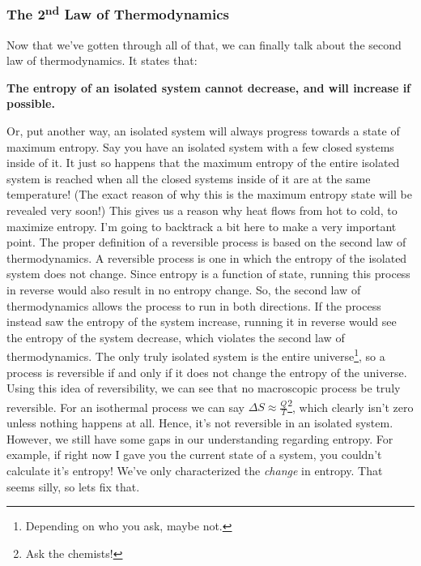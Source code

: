 \subsubsection{\texorpdfstring{The 2\textsuperscript{nd} Law of Thermodynamics}{The 2nd Law of Thermodynamics}}
Now that we've gotten through all of that, we can finally talk about the second law of thermodynamics. It states that:
\begin{center}
    \textbf{The entropy of an isolated system cannot decrease, and will increase if possible.}
\end{center}
Or, put another way, an isolated system will always progress towards a state of maximum entropy. Say you have an isolated system with a few closed systems inside of it. It just so happens that the maximum entropy of the entire isolated system is reached when all the closed systems inside of it are at the same temperature! (The exact reason of why this is the maximum entropy state will be revealed very soon!) This gives us a reason why heat flows from hot to cold, to maximize entropy.
\newline\newline
I'm going to backtrack a bit here to make a very important point. The proper definition of a reversible process is based on the second law of thermodynamics. A reversible process is one in which the entropy of the isolated system does not change. Since entropy is a function of state, running this process in reverse would also result in no entropy change. So, the second law of thermodynamics allows the process to run in both directions. If the process instead saw the entropy of the system increase, running it in reverse would see the entropy of the system decrease, which violates the second law of thermodynamics. The only truly isolated system is the entire universe\footnote{Depending on who you ask, maybe not.}, so a process is reversible if and only if it does not change the entropy of the universe.
\newline\newline
Using this idea of reversibility, we can see that no macroscopic process be truly reversible. For an isothermal process we can say $\Delta S \approx \frac{Q}{T}$\footnote{Ask the chemists!}, which clearly isn't zero unless nothing happens at all. Hence, it's not reversible in an isolated system.
\newline\newline
However, we still have some gaps in our understanding regarding entropy. For example, if right now I gave you the current state of a system, you couldn't calculate it's entropy! We've only characterized the \textit{change} in entropy. That seems silly, so lets fix that.
